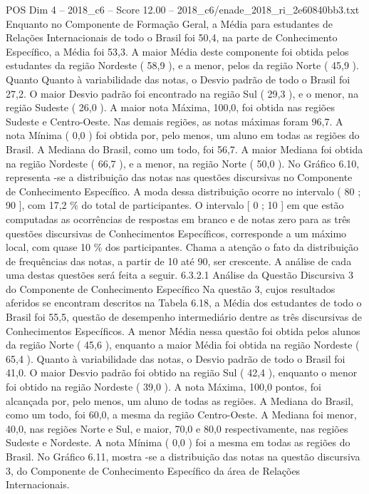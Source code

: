 \begin{textsample}{POS Dim 4 – 2018\_c6 – Score 12.00 – 2018\_c6/enade\_2018\_ri\_2e60840bb3.txt}
Enquanto no Componente de Formação Geral, a Média para estudantes de Relações Internacionais de todo o Brasil foi 50,4, na parte de Conhecimento Específico, a Média foi 53,3.
A maior Média deste componente foi obtida pelos estudantes da região Nordeste ( 58,9 ), e a menor, pelos da região Norte ( 45,9 ).
Quanto Quanto à variabilidade das notas, o Desvio padrão de todo o Brasil foi 27,2.
O maior Desvio padrão foi encontrado na região Sul ( 29,3 ), e o menor, na região Sudeste ( 26,0 ).
A maior nota Máxima, 100,0, foi obtida nas regiões Sudeste e Centro-Oeste.
Nas demais regiões, as notas máximas foram 96,7.
A nota Mínima ( 0,0 ) foi obtida por, pelo menos, um aluno em todas as regiões do Brasil.
A Mediana do Brasil, como um todo, foi 56,7.
A maior Mediana foi obtida na região Nordeste ( 66,7 ), e a menor, na região Norte ( 50,0 ).
No Gráfico 6.10, representa -se a distribuição das notas nas questões discursivas no Componente de Conhecimento Específico.
A moda dessa distribuição ocorre no intervalo ( 80 ; 90 ], com 17,2 \% do total de participantes.
O intervalo [ 0 ; 10 ] em que estão computadas as ocorrências de respostas em branco e de notas zero para as três questões discursivas de Conhecimentos Específicos, corresponde a um máximo local, com quase 10 \% dos participantes.
Chama a atenção o fato da distribuição de frequências das notas, a partir de 10 até 90, ser crescente.
A análise de cada uma destas questões será feita a seguir. 6.3.2.1 Análise da Questão Discursiva 3 do Componente de Conhecimento Específico Na questão 3, cujos resultados aferidos se encontram descritos na Tabela 6.18, a Média dos estudantes de todo o Brasil foi 55,5, questão de desempenho intermediário dentre as três discursivas de Conhecimentos Específicos.
A menor Média nessa questão foi obtida pelos alunos da região Norte ( 45,6 ), enquanto a maior Média foi obtida na região Nordeste ( 65,4 ).
Quanto à variabilidade das notas, o Desvio padrão de todo o Brasil foi 41,0.
O maior Desvio padrão foi obtido na região Sul ( 42,4 ), enquanto o menor foi obtido na região Nordeste ( 39,0 ).
A nota Máxima, 100,0 pontos, foi alcançada por, pelo menos, um aluno de todas as regiões.
A Mediana do Brasil, como um todo, foi 60,0, a mesma da região Centro-Oeste.
A Mediana foi menor, 40,0, nas regiões Norte e Sul, e maior, 70,0 e 80,0 respectivamente, nas regiões Sudeste e Nordeste.
A nota Mínima ( 0,0 ) foi a mesma em todas as regiões do Brasil.
No Gráfico 6.11, mostra -se a distribuição das notas na questão discursiva 3, do Componente de Conhecimento Específico da área de Relações Internacionais.

\end{textsample}
